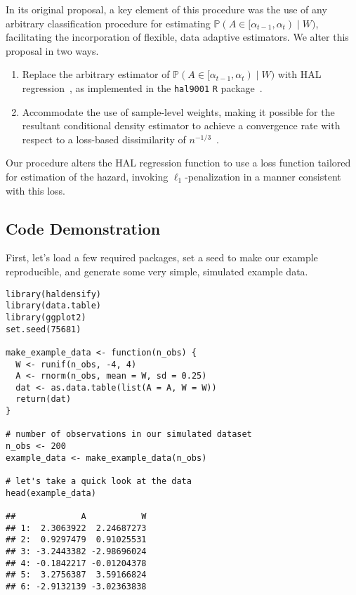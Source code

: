 In its original proposal, a key element of this procedure was the use of any
arbitrary classification procedure for estimating $\mathbb{P}(A \in
[\alpha_{t-1}, \alpha_t) \mid W)$, facilitating the incorporation of flexible,
data adaptive estimators. We alter this proposal in two ways.
\begin{enumerate}[topsep=0.5pt,itemsep=0pt,partopsep=1ex,parsep=1ex]
  \item Replace the arbitrary estimator of $\mathbb{P}(A \in [\alpha_{t-1},
      \alpha_t) \mid W)$ with HAL regression~\citep{vdl2015generally,
      benkeser2016highly,vdl2017generally}, as implemented in the
      \texttt{hal9001} \texttt{R} package~\citep{coyle2021hal9001,
      hejazi2020hal9001}.
  \item Accommodate the use of sample-level weights, making it possible for
     the resultant conditional density estimator to achieve a convergence rate
     with respect to a loss-based dissimilarity of
     $n^{-1/3}$~\citep{bibaut2019fast}.
\end{enumerate}

Our procedure alters the HAL regression function to use a loss function tailored
for estimation of the hazard, invoking $\ell_1$-penalization in a manner
consistent with this loss.

\subsection{Code Demonstration}

First, let's load a few required packages, set a seed to make our example
reproducible, and generate some very simple, simulated example data.

\begin{lstlisting}
library(haldensify)
library(data.table)
library(ggplot2)
set.seed(75681)

make_example_data <- function(n_obs) {
  W <- runif(n_obs, -4, 4)
  A <- rnorm(n_obs, mean = W, sd = 0.25)
  dat <- as.data.table(list(A = A, W = W))
  return(dat)
}

# number of observations in our simulated dataset
n_obs <- 200
example_data <- make_example_data(n_obs)

# let's take a quick look at the data
head(example_data)

##             A           W
## 1:  2.3063922  2.24687273
## 2:  0.9297479  0.91025531
## 3: -3.2443382 -2.98696024
## 4: -0.1842217 -0.01204378
## 5:  3.2756387  3.59166824
## 6: -2.9132139 -3.02363838
\end{lstlisting}


